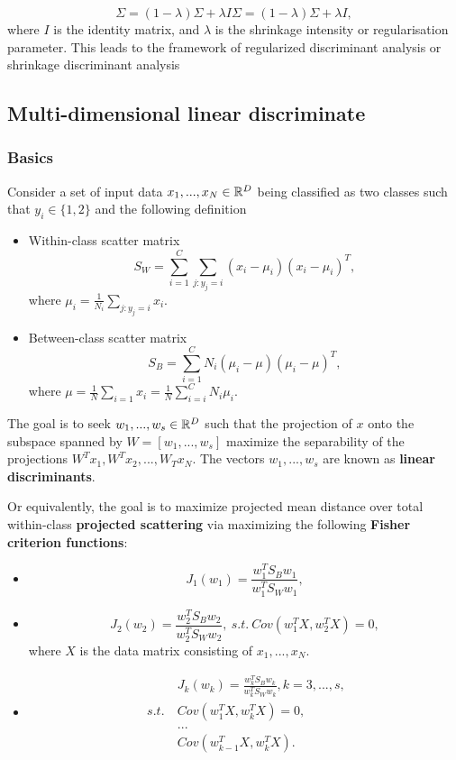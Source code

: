 \begin{refsection}
\begin{remark}
$$\Sigma =(1-\lambda )\Sigma +\lambda I \Sigma =(1-\lambda )\Sigma +\lambda I,$$
where $I$ is the identity matrix, and $ \lambda $ is the shrinkage intensity or regularisation parameter. This leads to the framework of regularized discriminant analysis or shrinkage discriminant analysis	
	
\end{remark}


\subsection{Multi-dimensional linear discriminate}

\subsubsection{Basics}

\begin{definition}\label{ch:statistical-learning:ch:statistical-learning:th:OptimalityConditionFisherCriterionMultiDimensional}\cite[654]{johnson2007applied}
Consider a set of input data $x_1,...,x_N\in \mathbb{R}^D$ being classified as two classes such that $y_i\in \{1,2\}$ and the following definition	
\begin{itemize}
		\item Within-class scatter matrix
	$$S_W = \sum_{i=1}^C \sum_{j:y_j = i} (x_i - \mu_i)(x_i - \mu_i)^T,$$
	where $\mu_i = \frac{1}{N_i}\sum_{j:y_j = i} x_i$.
	\item Between-class scatter matrix
	$$S_B = \sum_{i=1}^C N_i(\mu_i - \mu)(\mu_i - \mu)^T,$$
	where $\mu = \frac{1}{N}\sum_{i=1} x_i = \frac{1}{N}\sum_{i = i}^C N_i\mu_i$.
\end{itemize}


The goal is to seek $w_1,...,w_s\in \mathbb{R}^D$ such that the projection of $x$ onto the subspace spanned by $W=[w_1,...,w_s]$ maximize the separability of the projections $W^Tx_1, W^Tx_2,..., W_Tx_N$. The vectors $w_1,...,w_s$ are known as \textbf{linear discriminants}. 

Or equivalently, the goal is to maximize projected mean distance over total within-class \textbf{projected scattering} via maximizing the following \textbf{Fisher criterion functions}:
\begin{itemize}
	\item $$J_1(w_1) =\frac{w^T_1S_Bw_1}{w^T_1S_Ww_1},$$
	\item $$J_2(w_2) =\frac{w^T_2S_Bw_2}{w^T_2S_Ww_2}, ~s.t.~ Cov(w_1^TX,w_2^TX) = 0 ,$$
	where $X$ is the data matrix consisting of $x_1,...,x_N$.
	\item
	\begin{align*}
	& J_k(w_k) =\frac{w^T_kS_Bw_k}{w^T_kS_Ww_k},k=3,...,s,\\ 
	~s.t.~ & Cov(w_1^TX,w_k^TX) = 0,\\
	       & ... \\
	       & Cov(w_{k-1}^TX,w_k^TX). 
	\end{align*}
\end{itemize}
\end{definition}


\end{refsection}
